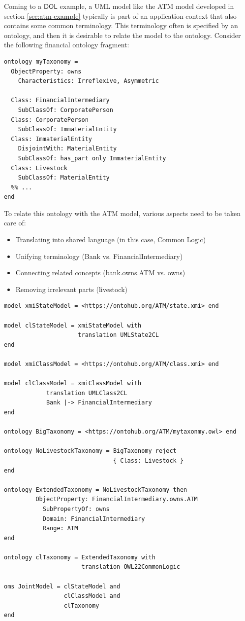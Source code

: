 \documentclass[10pt, a4paper]{isov2}
\newcommand*{\DOL}{\ensuremath{\mathsf{DOL}}\xspace}
\begin{document}
Coming to a \DOL example,
a UML model like the ATM model developed in section \ref{sec:atm-example} typically is part of an
application context that also contains some common terminology.
This terminology often is specified by an ontology, and then
it is desirable to relate the model to the ontology. Consider
the following financial ontology fragment:

\begin{lstlisting}[basicstyle=\ttfamily,language=dolText,alsolanguage=owl2Manchester,escapechar=@,mathescape]
ontology myTaxonomy =
  ObjectProperty: owns
    Characteristics: Irreflexive, Asymmetric

  Class: FinancialIntermediary
    SubClassOf: CorporatePerson
  Class: CorporatePerson
    SubClassOf: ImmaterialEntity
  Class: ImmaterialEntity
    DisjointWith: MaterialEntity
    SubClassOf: has_part only ImmaterialEntity
  Class: Livestock
    SubClassOf: MaterialEntity
  %% ...
end
\end{lstlisting}

 To relate this ontology with the ATM model, 
various aspects need to be taken care of:
 \begin{itemize} 
  \item Translating into shared language  (in this case, Common Logic)
  \item Unifying terminology (Bank vs. FinancialIntermediary)
  \item Connecting related concepts (bank.owns.ATM vs. owns)
  \item Removing irrelevant parts (livestock) 
 \end{itemize} 

\begin{lstlisting}[basicstyle=\ttfamily\small,language=dolText,alsolanguage=owl2Manchester,escapechar=@,mathescape]
model xmiStateModel = <https://ontohub.org/ATM/state.xmi> end

model clStateModel = xmiStateModel with
                     translation UMLState2CL
end

model xmiClassModel = <https://ontohub.org/ATM/class.xmi> end

model clClassModel = xmiClassModel with
            translation UMLClass2CL
            Bank |-> FinancialIntermediary
end

ontology BigTaxonomy = <https://ontohub.org/ATM/mytaxonmy.owl> end

ontology NoLivestockTaxonomy = BigTaxonomy reject
                               { Class: Livestock }
end

ontology ExtendedTaxonomy = NoLivestockTaxonomy then
         ObjectProperty: FinancialIntermediary.owns.ATM
           SubPropertyOf: owns
           Domain: FinancialIntermediary
           Range: ATM
end

ontology clTaxonomy = ExtendedTaxonomy with
                      translation OWL22CommonLogic

oms JointModel = clStateModel and
                 clClassModel and
                 clTaxonomy
end
\end{lstlisting}
\end{document}
